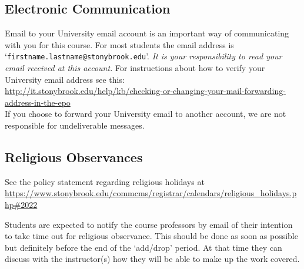 \documentclass[10pt]{article}
\begin{document}
\subsection*{Electronic Communication}

Email to your University email account is an important way
of communicating with you for this course.  For most students the
email address is `{\tt firstname.lastname@stonybrook.edu}'.
{\em It is your responsibility to read your email received at this
  account.}  For instructions about how to verify your University
email address see this: \\
{\small \url{http://it.stonybrook.edu/help/kb/checking-or-changing-your-mail-forwarding-address-in-the-epo}}\\
If you choose to forward your University email to another account, we
are not responsible for undeliverable messages.


\subsection*{Religious Observances}

See the policy statement regarding religious holidays at\hfill\\
{\small \url{https://www.stonybrook.edu/commcms/registrar/calendars/religious_holidays.php#2022}} \linebreak
%

Students are expected to notify the course professors by email of
their intention to take time out for religious observance.  This
should be done as soon as possible but definitely before the end of
the `add/drop' period.  At that time they can discuss with the
instructor(s) how they will be able to make up the work covered.
\end{document}
